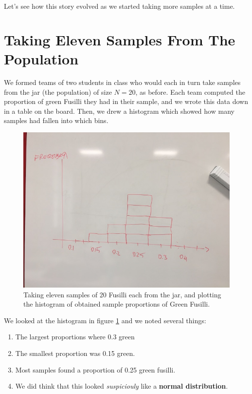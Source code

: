 \documentclass[]{book}
\providecommand{\tightlist}{%
  \setlength{\itemsep}{0pt}\setlength{\parskip}{0pt}}
\begin{document}
Let's see how this story evolved as we started taking more samples at a
time.

\section{Taking Eleven Samples From The
Population}\label{taking-eleven-samples-from-the-population}

We formed teams of two students in class who would each in turn take
samples from the jar (the population) of size \(N=20\), as before. Each
team computed the proportion of green Fusilli they had in their sample,
and we wrote this data down in a table on the board. Then, we drew a
histogram which showed how many samples had fallen into which bins.

\begin{figure}

{\centering \includegraphics[width=0.9\linewidth]{images/pasta6} 

}

\caption{Taking eleven samples of 20 Fusilli each from the jar, and plotting the histogram of obtained sample proportions of Green Fusilli.}\label{fig:pasta6}
\end{figure}

We looked at the histogram in figure \ref{fig:pasta6} and we noted
several things:

\begin{enumerate}
\def\labelenumi{\arabic{enumi}.}
\tightlist
\item
  The largest proportions where 0.3 green
\item
  The smallest proportion was 0.15 green.
\item
  Most samples found a proportion of 0.25 green fusilli.
\item
  We did think that this looked \emph{suspiciouly} like a \textbf{normal
  distribution}.
\end{enumerate}
\end{document}
